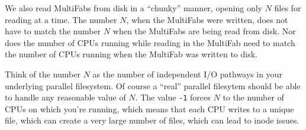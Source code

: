 We also read MultiFabs from disk in a ``chunky'' manner, opening only $N$
files for reading at a time.  The number $N$, when the MultiFabs were
written, does not have to match the number $N$ when the MultiFabs are
being read from disk.  Nor does the number of CPUs running while
reading in the MultiFab need to match the number of CPUs running when
the MultiFab was written to disk.

Think of the number $N$ as the number of independent I/O pathways in
your underlying parallel filesystem.  Of course a ``real'' parallel
filesytem should be able to handle any reasonable value of $N$.  The
value {\tt -1} forces $N$ to the number of CPUs on which you're
running, which means that each CPU writes to a unique file, which can
create a very large number of files, which can lead to inode issues.
